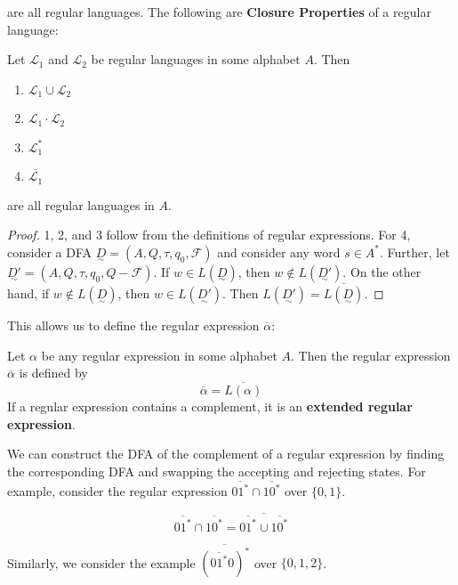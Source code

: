 are all regular languages. The following are \textbf{Closure Properties} of a regular language:

\begin{theorem}
      Let $\mathcal{L_1}$ and $\mathcal{L_2}$ be regular languages in some alphabet $A$. Then
      \begin{enumerate}[1)]
            \item $\mathcal{L}_1\cup\mathcal{L}_2$
            \item $\mathcal{L}_1\cdot \mathcal{L}_2$
            \item $\mathcal{L}_1^*$
            \item $\overline{\mathcal{L}_1}$
      \end{enumerate}

      are all regular languages in $A$.
\end{theorem}

\begin{proof}
      1, 2, and 3 follow from the definitions of regular expressions. For 4, consider a DFA $\underset{\sim}{D}=(A, Q, \tau, q_0, \mathcal{F})$ and consider any word $s\in A^*$. Further, let $\underset{\sim}{D'}=(A, Q, \tau, q_0, Q-\mathcal{F})$. If $w\in L(\underset{\sim}{D})$, then $w\not\in L(\underset{\sim}{D'})$. On the other hand, if $w\not\in L(\underset{\sim}{D})$, then $w\in L(\underset{\sim}{D'})$. Then $L(\underset{\sim}{D'})=\overline{L(\underset{\sim}{D})}$.
\end{proof}

This allows us to define the regular expression $\overline{\alpha}$:

\begin{definition}
      Let $\alpha$ be any regular expression in some alphabet $A$. Then the regular expression $\overline{\alpha}$ is defined by \[\overline{\alpha}=\overline{L(\alpha)}\] If a regular expression contains a complement, it is an \textbf{extended regular expression}.
\end{definition}

We can construct the DFA of the complement of a regular expression by finding the corresponding DFA and swapping the accepting and rejecting states. For example, consider the regular expression $\overline{01^*}\cap\overline{10^*}$ over $\{0, 1\}$. 

\[\overline{01^*}\cap\overline{10^*}=\overline{\overline{01^*}\cup\overline{10^*}}\]

Similarly, we consider the example $\overline{(\overline{01^*}0)^*}$ over $\{0,1,2\}$.

